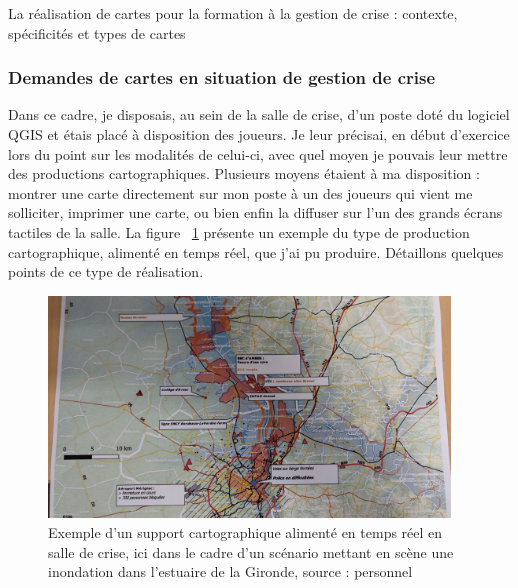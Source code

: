 \documentclass[10pt,a4paper]{report} %
\begin{document}
\begin{part}{La réalisation de cartes pour la formation à la gestion de crise : contexte, spécificités et types de cartes}
\subsubsection{Demandes de cartes en situation de gestion de crise}

Dans ce cadre, je disposais, au sein de la salle de crise, d’un poste doté du logiciel QGIS et étais placé à disposition des joueurs. Je leur précisai, en début d’exercice lors du point sur les modalités de celui-ci, avec quel moyen je pouvais leur mettre des productions cartographiques. Plusieurs moyens étaient à ma disposition : montrer une carte directement sur mon poste à un des joueurs qui vient me solliciter, imprimer une carte, ou bien enfin la diffuser sur l’un des grands écrans tactiles de la salle. La figure ~\ref{fig8} présente un exemple du type de production cartographique, alimenté en temps réel, que j’ai pu produire. Détaillons quelques points de ce type de réalisation.
\begin{figure}[!t]
    \centering
    \includegraphics[width=0.95\textwidth]{figures/EOLE33_support.jpg}
    \caption{Exemple d’un support cartographique alimenté en temps réel en salle de crise, ici dans le cadre d’un scénario mettant en scène une inondation dans l’estuaire de la Gironde, source : personnel}
    \label{fig8}
\end{figure}


\end{part}
\end{document}
